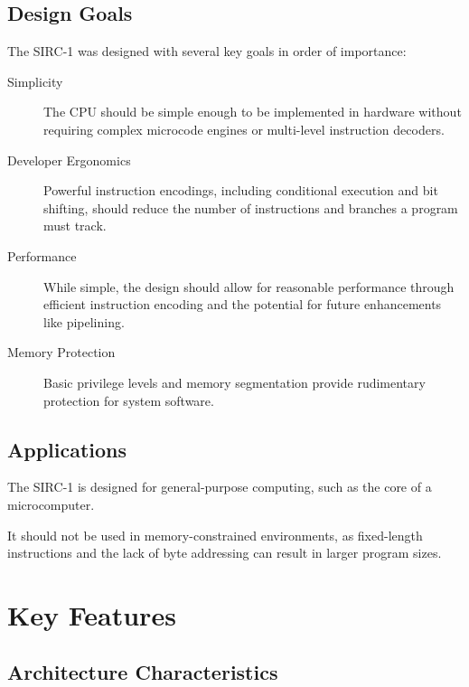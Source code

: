 \subsection{Design Goals}

The SIRC-1 was designed with several key goals in order of importance:

\begin{description}
	\item[Simplicity] The CPU should be simple enough to be implemented in hardware without requiring complex microcode engines
	      or multi-level instruction decoders.

	\item[Developer Ergonomics] Powerful instruction encodings, including conditional execution and bit shifting, should reduce
	      the number of instructions and branches a program must track.

	\item[Performance] While simple, the design should allow for reasonable performance through efficient instruction encoding
	      and the potential for future enhancements like pipelining.

	\item[Memory Protection] Basic privilege levels and memory segmentation provide rudimentary protection for system software.
\end{description}

\subsection{Applications}

The SIRC-1 is designed for general-purpose computing, such as the core of a microcomputer.

\noindent It should not be used in memory-constrained environments, as fixed-length instructions and the lack of byte addressing can result in larger program sizes.

\section{Key Features}

\subsection{Architecture Characteristics}

